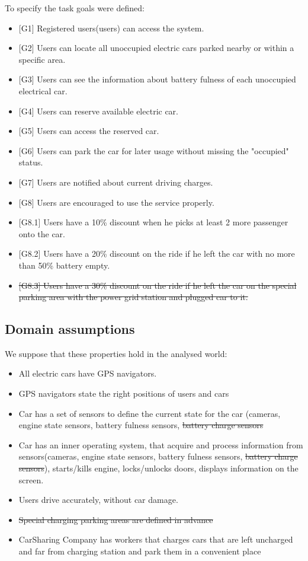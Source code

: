 \documentclass[12pt, letterpaper]{article}
\begin{document}
To specify the task goals were defined:
\begin{itemize}
	\item {[G1]} Registered users(users) can access the system.
	\item {[G2]} Users can locate all unoccupied electric cars parked nearby or within a specific area.
	\item {[G3]} Users can see the information about battery fulness of each unoccupied electrical car.
	\item {[G4]} Users can reserve available electric car.
	\item {[G5]} Users can access the reserved car.
	\item {[G6]} Users can park the car for later usage without missing the "occupied" status.
	\item {[G7]} Users are notified about current driving charges.
	\item {[G8]} Users are encouraged to use the service properly.
	\item {[G8.1]} Users have a 10\% discount when he picks at least 2 more passenger onto the car.
	\item {[G8.2]} Users have a 20\% discount on the ride if he left the car with no more than 50\% battery empty.
	\item \sout{[G8.3] Users have a 30\% discount on the ride if he left the car on the special parking area with the power grid station and plugged car to it.}
\end{itemize}

\subsection{Domain assumptions}

We suppose that these properties hold in the analysed world:
\begin{itemize}
	\item All electric cars have GPS navigators.
	\item GPS navigators state the right positions of users and cars 
	\item Car has a set of sensors to define the current state for the car (cameras, engine
	state sensors, battery fulness sensors, \sout{battery charge sensors} 
	\item Car has an inner operating system, that acquire and process information from sensors(cameras, engine
	state sensors, battery fulness sensors, \sout{battery charge sensors}), starts/kills engine, locks/unlocks doors, displays
	information on the screen.
	\item Users drive accurately, without car damage.
	\item \sout{Special charging parking areas are defined in advance}
	\item CarSharing Company has workers that charges cars that are left uncharged and far from
	charging station and park them in a convenient place \\
\end{itemize}
\end{document}
